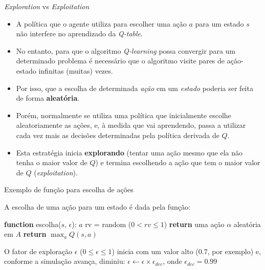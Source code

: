 \documentclass{beamer}
\begin{document}
\begin{frame}{\textit{Exploration} vs \textit{Exploitation}}
	\begin{itemize}
		\item<1-> A política que o agente utiliza para escolher 
		uma ação $a$ para um estado $s$ não interfere no aprendizado 
		da \textit{Q-table}.
		\item<2-> No entanto, para que o algoritmo \textit{Q-learning} possa convergir 
		para um determinado problema é necessário que o algoritmo visite pares de 
		ação-estado infinitas (muitas) vezes.
		\item<3-> Por isso, que a escolha de determinada \textit{ação} em um \textit{estado} 
		poderia ser feita de forma \textbf{aleatória}. 
		
		\item<4-> Porém, normalmente se utiliza uma política que inicialmente escolhe 
		aleatoriamente as ações, e, à medida que vai aprendendo, passa a utilizar cada 
		vez mais as decisões determinadas pela política derivada de $Q$. 
		
		\item<5-> Esta estratégia inicia \textbf{explorando} (tentar uma ação mesmo que ela não 
		tenha o maior valor de $Q$) e termina escolhendo a ação que tem o 
		maior valor de $Q$ (\textit{exploitation}).  
		
	\end{itemize}
\end{frame}


\begin{frame}{Exemplo de função para escolha de ações}
	
	A escolha de uma ação para um estado é dada pela função:
	
	\vspace{0.3cm}
	
	\begin{algorithmic} 
		\STATE \textbf{function} escolha($s$, $\epsilon$): $a$
		\STATE rv = random ($0 < rv \leq 1$)
		\STATE \textbf{return} uma ação $\alpha$ aleatória em $A$
		\ENDIF   
		\STATE \textbf{return} $\max_{a}{Q(s, a)} $
	\end{algorithmic}

	\vspace{0.3cm}
	
	O fator de exploração $\epsilon$ ($0 \leq \epsilon \leq 1$) inicia com um valor 
	alto ($0.7$, por exemplo) e, conforme a simulação avança, 
	diminiu: $\epsilon \leftarrow \epsilon \times \epsilon_{dec}$, 
	onde $\epsilon_{dec} = 0.99$
	
\end{frame}
\end{document}
